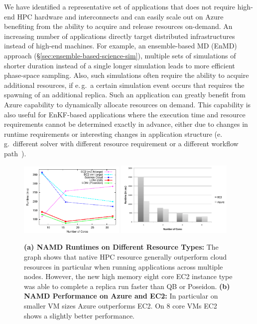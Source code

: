 \documentclass[3p,twocolumn]{elsarticle}
\begin{document}
We have identified a representative set of applications that does not
require high-end HPC hardware and interconnects and can easily scale
out on Azure benefiting from the ability to acquire and release
resources on-demand.  An increasing number of applications directly
target distributed infrastructures instead of high-end machines. For
example, an ensemble-based MD (EnMD) approach
(\S\ref{sec:ensemble-based-science-sim}), multiple sets of simulations
of shorter duration instead of a single longer simulation leads to
more efficient phase-space sampling. Also, such simulations often
require the ability to acquire additional resources, if e.\,g.\ a
certain simulation event occurs that requires the spawning of an
additional replica.  Such an application can greatly benefit from
Azure capability to dynamically allocate resources on demand. This
capability is also useful for EnKF-based applications where the
execution time and resource requirements cannot be determined exactly
in advance, either due to changes in runtime requirements or
interesting changes in application structure (e.\,g.\ different solver
with different resource requirement or a different workflow
path~\cite{enkf_hybrid_grid_cloud}).



\begin{figure}[tbp]
  \centering
  \includegraphics[width=0.45\textwidth]{figures/namd_run.pdf}
  \label{tbd}
  \includegraphics[width=0.5\textwidth]{figures/namd_ec2_azure}
  \label{fig:perf_namd_ec2_azure}
  \caption{\textbf{(a) NAMD Runtimes on Different Resource Types: }
    The graph shows that native HPC resource generally outperform
    cloud resources in particular when running applications across
    multiple nodes. However, the new high memory eight core EC2
    instance type was able to complete a replica run faster than QB or
    Poseidon. \textbf{(b) NAMD Performance on Azure and EC2:} In particular on
    smaller VM sizes Azure outperforms EC2.  On 8 core VMs EC2 shows a
    slightly better performance.}
   \label{fig:performance_namd_run}
\end{figure}
\end{document}
